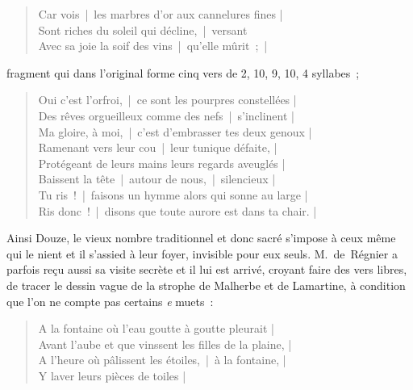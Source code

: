 \documentclass[french,twoside]{book} %
\newcommand{\bibl}[1]{{\RaggedLeft{#1}\par\bigskip}}
\newenvironment{quoteblock}%
  {\begin{quoting}}
  {\end{quoting}}
\newenvironment{quotebar}{%
    \def\FrameCommand{{\color{rubric!10!}\vrule width 0.5em} \hspace{0.9em}}%
    \def\OuterFrameSep{\itemsep} %
    \MakeFramed {\advance\hsize-\width \FrameRestore}
  }%
  {%
    \endMakeFramed
  }
\renewenvironment{quoteblock}%
  {%
    \savenotes
    \setstretch{0.9}
    \normalfont
    \begin{quotebar}
  }
  {%
    \end{quotebar}
    \spewnotes
  }
\begin{document}
\begin{verse}
Car vois | les marbres d’or aux cannelures fines |\\
Sont riches du soleil qui décline, | versant\\
Avec sa joie la soif des vins | qu’elle mûrit ; | \\
\end{verse}

\noindent fragment qui dans l’original forme cinq vers de 2, 10, 9, 10, 4 syllabes ;\par


\begin{verse}
Oui c’est l’orfroi, | ce sont les pourpres constellées |\\
Des rêves orgueilleux comme des nefs | s’inclinent |\\
Ma gloire, à moi, | c’est d’embrasser tes deux genoux |\\
Ramenant vers leur cou | leur tunique défaite, |\\
Protégeant de leurs mains leurs regards aveuglés |\\
Baissent la tête | autour de nous, | silencieux |\\
Tu ris ! | faisons un hymme alors qui sonne au large |\\
Ris donc ! | disons que toute aurore est dans ta chair. |\\
\end{verse}
\begin{quoteblock}

\bibl{({\itshape La Clarté de Vie}.)}
\end{quoteblock}

\noindent Ainsi Douze, le vieux nombre traditionnel et donc sacré s’impose à ceux même qui le nient et il s’assied à leur foyer, invisible pour eux seuls. M. de Régnier a parfois reçu aussi sa visite secrète et il lui est arrivé, croyant faire des vers libres, de tracer le dessin vague de la strophe de Malherbe et de Lamartine, à condition que l’on ne compte pas certains {\itshape e} muets :\par


\begin{verse}
A la fontaine où l’eau goutte à goutte pleurait |\\
Avant l’aube et que vinssent les filles de la plaine, |\\
A l’heure où pâlissent les étoiles, | à la fontaine, |\\
Y laver leurs pièces de toiles |\\
\end{verse}
\end{document}
